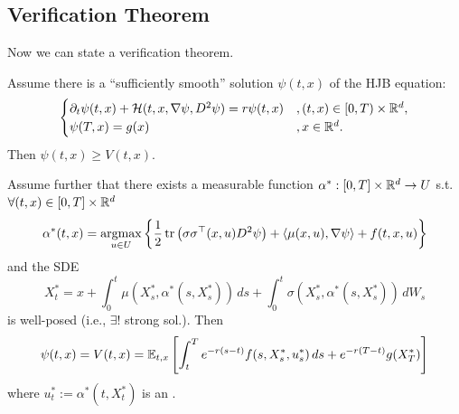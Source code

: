 \subsection{Verification Theorem}

Now we can state a verification theorem.

\begin{theorem}
    Assume there is a ``sufficiently smooth'' solution $\psi(t,x)$ of the HJB equation:
    \begin{equation*}
        \begin{cases} 
            \partial_t \psi(t,x) + \mathcal{H}(t, x, \nabla \psi, D^2 \psi) = r \psi(t,x) & , (t,x) \in [0,T) \times \mathbb R^d, \\ 
            \psi(T,x) = g(x) & , x \in \mathbb R^d. 
        \end{cases}
    \end{equation*}
    Then $\psi(t,x) \geq V(t,x)$.
    
    Assume further that there exists a measurable function $\alpha^*: [0,T] \times \mathbb R^d \to U$ s.t. $\forall (t,x) \in [0,T] \times \mathbb R^d$
    \[ \alpha^*(t,x) = \operatorname*{argmax}_{u \in U} \left\{ \frac{1}{2} \operatorname{tr} \left(\sigma \sigma^\top(x,u) D^2 \psi\right) + \langle \mu(x,u), \nabla \psi \rangle + f(t,x,u) \right\} \]
    and the SDE
    \[ X_t^* = x + \int_0^t \mu(X_s^*, \alpha^*(s, X_s^*)) \, ds + \int_0^t \sigma(X_s^*, \alpha^*(s, X_s^*)) \, dW_s \]
    is well-posed (i.e., $\exists!$ strong sol.). Then
    \[ \psi(t,x) = V(t,x) = \mathbb E_{t,x} \left[ \int_t^T e^{-r(s-t)} f(s, X_s^*, u_s^*) \, ds + e^{-r(T-t)} g(X_T^*) \right] \]
    where $u_t^* := \alpha^*(t, X_t^*)$ is an .
\end{theorem}

